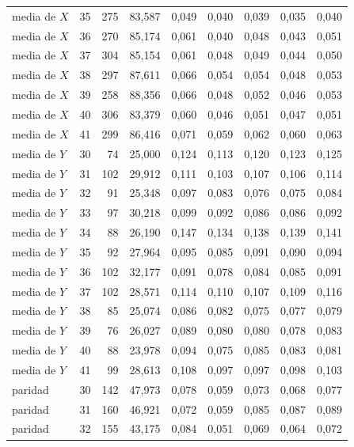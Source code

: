 \begin{table}[htbp]
{\begin{tabular}{@{}lrrrrrrrr@{}}
        media de $X$ & 35 & 275 & 83,587 & 0,049 & 0,040 & 0,039 & 0,035 & 0,040 \\
        media de $X$ & 36 & 270 & 85,174 & 0,061 & 0,040 & 0,048 & 0,043 & 0,051 \\
        media de $X$ & 37 & 304 & 85,154 & 0,061 & 0,048 & 0,049 & 0,044 & 0,050 \\
        media de $X$ & 38 & 297 & 87,611 & 0,066 & 0,054 & 0,054 & 0,048 & 0,053 \\
        media de $X$ & 39 & 258 & 88,356 & 0,066 & 0,048 & 0,052 & 0,046 & 0,053 \\
        media de $X$ & 40 & 306 & 83,379 & 0,060 & 0,046 & 0,051 & 0,047 & 0,051 \\
        media de $X$ & 41 & 299 & 86,416 & 0,071 & 0,059 & 0,062 & 0,060 & 0,063 \\
        media de $Y$ & 30 & 74 & 25,000 & 0,124 & 0,113 & 0,120 & 0,123 & 0,125 \\
        media de $Y$ & 31 & 102 & 29,912 & 0,111 & 0,103 & 0,107 & 0,106 & 0,114 \\
        media de $Y$ & 32 & 91 & 25,348 & 0,097 & 0,083 & 0,076 & 0,075 & 0,084 \\
        media de $Y$ & 33 & 97 & 30,218 & 0,099 & 0,092 & 0,086 & 0,086 & 0,092 \\
        media de $Y$ & 34 & 88 & 26,190 & 0,147 & 0,134 & 0,138 & 0,139 & 0,141 \\
        media de $Y$ & 35 & 92 & 27,964 & 0,095 & 0,085 & 0,091 & 0,090 & 0,094 \\
        media de $Y$ & 36 & 102 & 32,177 & 0,091 & 0,078 & 0,084 & 0,085 & 0,091 \\
        media de $Y$ & 37 & 102 & 28,571 & 0,114 & 0,110 & 0,107 & 0,109 & 0,116 \\
        media de $Y$ & 38 & 85 & 25,074 & 0,086 & 0,082 & 0,075 & 0,077 & 0,079 \\
        media de $Y$ & 39 & 76 & 26,027 & 0,089 & 0,080 & 0,080 & 0,078 & 0,083 \\
        media de $Y$ & 40 & 88 & 23,978 & 0,094 & 0,075 & 0,085 & 0,083 & 0,081 \\
        media de $Y$ & 41 & 99 & 28,613 & 0,108 & 0,097 & 0,097 & 0,098 & 0,103 \\
        paridad & 30 & 142 & 47,973 & 0,078 & 0,059 & 0,073 & 0,068 & 0,077 \\
        paridad & 31 & 160 & 46,921 & 0,072 & 0,059 & 0,085 & 0,087 & 0,089 \\
        paridad & 32 & 155 & 43,175 & 0,084 & 0,051 & 0,069 & 0,064 & 0,072 \\

\end{tabular}}
\end{table}
